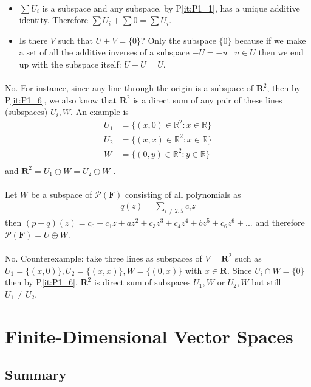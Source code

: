 \documentclass[11pt,notitlepage,oneside]{article}
\newcommand{\pref}[1]{P\ref{#1}}
\newcommand{\exo}[1]{%
\addtocontents{toc}{\protect\setcounter{tocdepth}{2}}%
\paragraph{#1}}
\begin{document}
\exo{} \begin{itemize}
\item $\sum U_i$ is a subspace and any subspace, by \pref{it:P1_1}, has a unique additive identity. Therefore $\sum U_i + \sum 0 = \sum U_i$.
\item  Is there $V$ such that $U+V = \{0\}$? Only the subspace $\{0\}$ because if we make a set of all the additive inverses of a subspace $-U = {-u \mid u\in U}$ then we end up with the subspace itself: $ U - U = U$. 
\end{itemize}
\exo{} No. For instance, since any line through the origin is a subspace of $\mathbf{R}^2$, then by \pref{it:P1_6}, we also know 
that $\mathbf{R}^2$ is a direct sum of any pair of these lines (subspaces) $U_i, W$. 
An example is
\begin{align*}
  U_1 &= \{(x,0)\in \mathbb{R}^2 :x \in \mathbb{R} \}  \\
  U_2 &= \{(x,x)\in \mathbb{R}^2 :x \in \mathbb{R} \}  \\
  W   &= \{(0,y)\in \mathbb{R}^2 :y \in \mathbb{R} \}  \\
\end{align*}
and $\mathbf{R}^2 = U_1 \oplus W = U_2 \oplus W $ .

\exo{} Let $W$ be a subspace of $\mathcal{P}(\mathbf{F})$ consisting of all polynomials as
\begin{align}
  q(z) = \sum\limits_{i\neq2,5} c_i z
\end{align}
then $(p+q)(z) = c_0 + c_1z + a z^2+ c_3 z^3 + c_4 z^4 + b z^5 + c_6 z^6 + ...$ and therefore $\mathcal{P}(\mathbf{F}) = U \oplus W$. 

\exo{} No. Counterexample: take three lines as subspaces of $V=\mathbf{R}^2$ such as $U_1=\{(x,0)\}, U_2=\{(x,x)\}, W=\{(0,x)\}$ with $x\in \mathbf{R}$. Since
$U_i\cap W = \{0\}$ then by \pref{it:P1_6}, $\mathbf{R}^2$ is direct sum of subspaces $U_1,W$ or $U_2,W$ but still $U_1\neq U_2$. 

\newpage
\section{Finite-Dimensional Vector Spaces}
\subsection*{Summary}

\newpage
{}
\small


\end{document}
